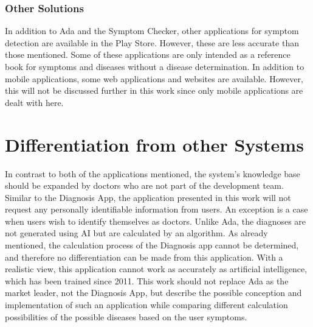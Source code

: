 \subsubsection{Other Solutions}
In addition to Ada and the Symptom Checker, other applications for symptom detection are available in the Play Store. However, these are less accurate than those mentioned. Some of these applications are only intended as a reference book for symptoms and diseases without a disease determination. In addition to mobile applications, some web applications and websites are available. However, this will not be discussed further in this work since only mobile applications are dealt with here.

\section{Differentiation from other Systems}
In contrast to both of the applications mentioned, the system's knowledge base should be expanded by doctors who are not part of the development team. Similar to the Diagnosis App, the application presented in this work will not request any personally identifiable information from users. An exception is a case when users wish to identify themselves as doctors. Unlike Ada, the diagnoses are not generated using AI but are calculated by an algorithm. As already mentioned, the calculation process of the Diagnosis app cannot be determined, and therefore no differentiation can be made from this application. With a realistic view, this application cannot work as accurately as artificial intelligence, which has been trained since 2011. This work should not replace Ada as the market leader, not the Diagnosis App, but describe the possible conception and implementation of such an application while comparing different calculation possibilities of the possible diseases based on the user symptoms.




